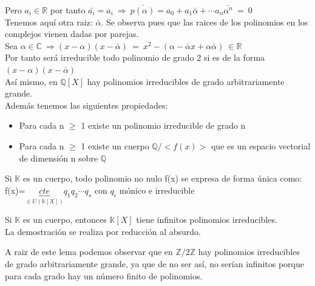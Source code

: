 \documentclass[nochap]{apuntes}
\begin{document}
Pero $a_i\in \mathbb{R}$  por tanto $\bar{a_i}=a_i \ \Rightarrow \ \bar{p(\alpha)}=a_0+a_1\bar{\alpha}+\cdots a_n\bar{\alpha^{n}} \ =\ 0$\\
Tenemos aquí otra raiz: $\bar{\alpha}$. Se observa pues que las raices de los polinomios en los complejos vienen dadas por parejas.\\

Sea $\alpha \in \mathbb{C} \ \Rightarrow (x-\alpha)(x-\bar{\alpha})\ = \ x^{2}-(\alpha - \bar{\alpha}x+\alpha\bar{\alpha}) \ \in \mathbb{R}$\\
Por tanto será irreducible todo polinomio de grado 2 si es de la forma $(x-\alpha)(x-\bar{\alpha})$\\

Así mismo, en $\mathbb{Q}[X]$  hay polinomios irreducibles de grado arbitrariamente grande.\\
Además tenemos las siguientes propiedades:
\begin{itemize}
 \item Para cada n $\geq$  1 existe un polinomio irreducible de grado n
 \item Para cada n $\geq$  1 existe un cuerpo $\mathbb{Q}/<f(x)>$  que es un espacio vectorial de dimensión n sobre $\mathbb{Q}$
\end{itemize}

\begin{theorem}
 Si $\mathbb{K}$  es un cuerpo, todo polinomio no nulo f(x) se expresa de forma única como:\\
 f(x)=$\underbrace{cte}_{\in U(\mathbb{K}[X])}q_1q_2\cdots q_s$  con $q_i$  mónico e irreducible\\
\end{theorem}

\begin{lemma}
 Si $\mathbb{K}$  es un cuerpo, entonces $\mathbb{K}[X]$  tiene infinitos polinomios irreducibles.\\
 La demostración se realiza por reducción al absurdo.
\end{lemma}
A raiz de este lema podemos observar que en $\mathbb{Z}/2\mathbb{Z}$  hay polinomios irreducibles de grado arbitrariamente grande, ya que
de no ser así, no serían infinitos porque para cada grado hay un número finito de polinomios.


\newpage 
\printindex
\end{document}
